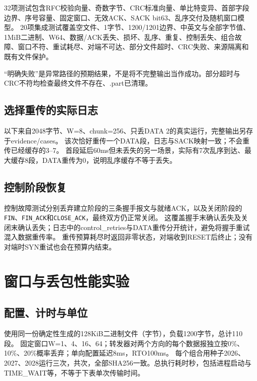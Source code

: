 \documentclass[UTF8,notitlepage,11pt]{ctexart}
\newcommand{\src}[1]{\nolinkurl{#1}}
\begin{document}
32项测试包含RFC校验向量、奇数字节、CRC标准向量、单比特变异、首部字段边界、序号容量、固定窗口、无效ACK、SACK bit63、乱序交付及随机窗口模型。
20项集成测试覆盖空文件、1字节、1200/1201边界、中英文与全部字节值、1MiB二进制、W64、数据/ACK丢失、损坏、乱序、重复、控制丢失、组合故障、窗口不符、重试耗尽、对端不可达、部分文件超时、CRC失败、来源隔离和既有文件保护。

\begin{table}[H]\centering\small\caption{代表性真实传输/故障场景}

\end{table}
“明确失败”是异常路径的预期结果，不是将不完整输出当作成功。部分超时与CRC不符均检查最终文件不存在、.part已清理。

\subsection{选择重传的实际日志}
以下来自2048字节、W=8、chunk=256、只丢DATA 2的真实运行，完整输出另存于evidence/cases。
该次恰好重传一个DATA段，日志与SACK映射一致；不会重传已经缓存的3--7。
首段延后60ms但未丢失的另一场景，实际有7次乱序到达、最大缓存8段，DATA重传为0，说明乱序缓存不等于丢失。

\subsection{控制阶段恢复}
控制故障测试分别丢弃建立阶段的三条握手报文与就绪ACK，以及关闭阶段的\src{FIN}、\src{FIN_ACK}和\src{CLOSE_ACK}，最终双方仍正常关闭。
这覆盖握手末确认丢失及关闭末确认丢失；日志中的control\_retries与DATA重传分开统计，避免将握手重试混入数据重传率。
重传预算耗尽时返回非零状态，对端收到RESET后终止；没有对端时SYN重试也会在预算内结束。

\section{窗口与丢包性能实验}\label{sec:performance}
\subsection{配置、计时与单位}
使用同一份确定性生成的128KiB二进制文件（\BenchBytes{}字节），负载1200字节，总计110段。
固定窗口W=1、4、16、64；转发器对两个方向的每个数据报独立按0\%、10\%、20\%概率丢弃；单向配置延迟8ms，RTO100ms。
每个组合用种子2026、2027、2028运行三次，共\BenchRuns{}次，全部SHA256一致。总执行耗时\BenchTime{}秒，包括进程启动与TIME\_WAIT等，不等于下表单次传输时间。
\end{document}
